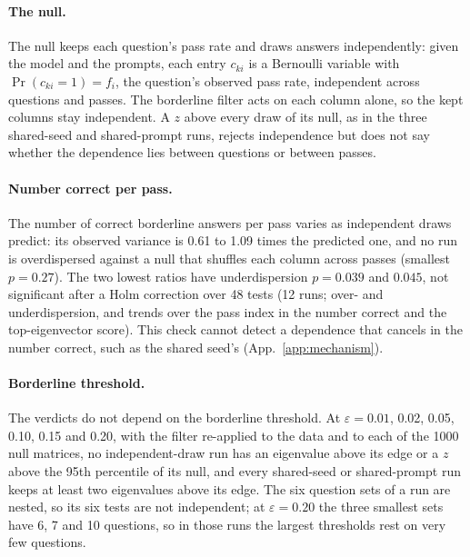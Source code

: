 \documentclass{article}
\theoremstyle{plain}
\theoremstyle{remark}
\begin{document}
\paragraph{The null.} The null keeps each question's pass rate and
draws answers independently: given the model and the prompts, each entry
$c_{ki}$ is a Bernoulli variable with $\Pr(c_{ki}=1)=f_i$, the
question's observed pass rate, independent across questions and passes.
The borderline filter acts on each column alone, so the kept columns
stay independent. A $z$ above every draw of its null, as in the three
shared-seed and shared-prompt runs, rejects independence but does not
say whether the dependence lies between questions or between passes.

\paragraph{Number correct per pass.} The number of correct borderline
answers per pass varies as independent draws predict: its observed
variance is 0.61 to 1.09
times the predicted one, and no run is overdispersed against a null that
shuffles each column across passes (smallest $p=0.27$). The two lowest
ratios have underdispersion $p=0.039$ and $0.045$, not significant after
a Holm correction over 48 tests (12 runs; over- and underdispersion, and
trends over the pass index in the number correct and the top-eigenvector
score). This check cannot detect a dependence that cancels in the number
correct, such as the shared seed's (App.~\ref{app:mechanism}).

\paragraph{Borderline threshold.} The verdicts do not depend on the
borderline threshold. At $\varepsilon=0.01$, 0.02, 0.05, 0.10, 0.15 and
0.20, with the filter re-applied to the data and to each of the 1000
null matrices, no independent-draw run has an eigenvalue above its edge
or a $z$ above the 95th percentile of its null, and every shared-seed or
shared-prompt run keeps at least two eigenvalues above its edge. The six
question sets of a run are nested, so its six tests are not independent;
at $\varepsilon=0.20$ the three smallest sets have 6, 7 and 10
questions, so in those runs the largest thresholds rest on very few questions.
\end{document}

